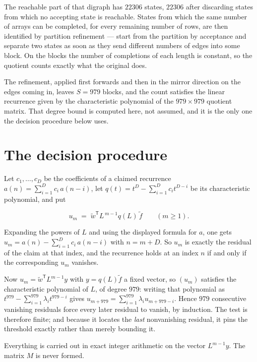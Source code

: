 \documentclass[11pt]{article}
\theoremstyle{definition}
\begin{document}
The reachable part of that digraph has $22306$ states, $22306$ after discarding states from which no accepting state is reachable. States from which the same number of arrays can be completed, for every remaining number of rows, are then identified by partition refinement --- start from the partition by acceptance and separate two states as soon as they send different numbers of edges into some block. On the blocks the number of completions of each length is constant, so the quotient counts exactly what the original does.

The refinement, applied first forwards and then in the mirror direction on the edges coming in, leaves $S = 979$ blocks, and the count satisfies the linear recurrence given by the characteristic polynomial of the $979 \times 979$ quotient matrix. That degree bound is computed here, not assumed, and it is the only one the decision procedure below uses.

\section{The decision procedure}

Let $c_1,\dots,c_D$ be the coefficients of a claimed recurrence $a(n) = \sum_{i=1}^{D} c_i\,a(n-i)$, let $q(t) = t^{D} - \sum_{i=1}^{D} c_i t^{D-i}$ be its characteristic polynomial, and put

\[u_m \;=\; \tilde w^{\mathsf T} L^{\,m-1} q(L)\,\tilde f \qquad (m \ge 1).\]

Expanding the powers of $L$ and using the displayed formula for $a$, one gets $u_m = a(n) - \sum_{i=1}^{D} c_i\,a(n-i)$ with $n = m + D$. So $u_m$ is exactly the residual of the claim at that index, and the recurrence holds at an index $n$ if and only if the corresponding $u_m$ vanishes.

Now $u_m = \tilde w^{\mathsf T} L^{m-1} y$ with $y = q(L)\tilde f$ a fixed vector, so $(u_m)$ satisfies the characteristic polynomial of $L$, of degree $979$: writing that polynomial as $t^{979} - \sum_{i=1}^{979} \lambda_i t^{979-i}$ gives $u_{m+979} = \sum_{i=1}^{979} \lambda_i u_{m+979-i}$. Hence $979$ consecutive vanishing residuals force every later residual to vanish, by induction. The test is therefore finite; and because it locates the {\itshape last} nonvanishing residual, it pins the threshold exactly rather than merely bounding it.

Everything is carried out in exact integer arithmetic on the vector $L^{m-1}y$. The matrix $M$ is never formed.
\end{document}
